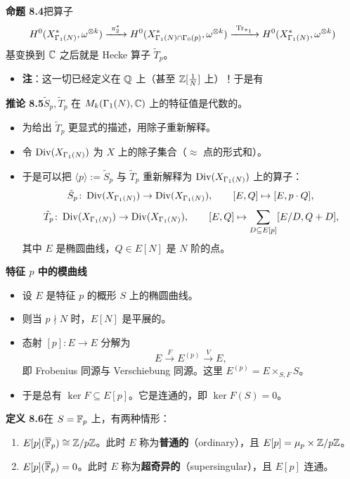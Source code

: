 \noindent\textbf{命题 8.4}\label{prop:8.4}\quad 把算子
\[
H^0(X^*_{\Gamma_1(N)},\omega^{\otimes k})\xrightarrow{\ \pi_2^*\ }H^0(X^*_{\Gamma_1(N)\cap\Gamma_0(p)},\omega^{\otimes k})\xrightarrow{\ \Tr_{\pi_1}\ }H^0(X^*_{\Gamma_1(N)},\omega^{\otimes k})
\]
基变换到 $\mathbb{C}$ 之后就是 Hecke 算子 $\tilde T_p$。

\begin{itemize}
\item \textbf{注}：这一切已经定义在 $\mathbb{Q}$ 上（甚至 $\mathbb{Z}[\frac1N]$ 上）！于是有
\end{itemize}

\noindent\textbf{推论 8.5}\label{cor:8.5}\quad $\tilde S_p,\tilde T_p$ 在 $M_k(\Gamma_1(N),\mathbb{C})$ 上的特征值是代数的。

\begin{itemize}
\item 为给出 $\tilde T_p$ 更显式的描述，用除子重新解释。
\item 令 $\operatorname{Div}(X_{\Gamma_1(N)})$ 为 $X$ 上的除子集合（$\approx$ 点的形式和）。
\item 于是可以把 $\langle p\rangle:=\tilde S_p$ 与 $\tilde T_p$ 重新解释为 $\operatorname{Div}(X_{\Gamma_1(N)})$ 上的算子：
\[
\tilde S_p\colon\operatorname{Div}(X_{\Gamma_1(N)})\to\operatorname{Div}(X_{\Gamma_1(N)}),\qquad [E,Q]\mapsto[E,p\cdot Q],
\]
\[
\tilde T_p\colon\operatorname{Div}(X_{\Gamma_1(N)})\to\operatorname{Div}(X_{\Gamma_1(N)}),\qquad [E,Q]\mapsto\sum_{D\subseteq E[p]}[E/D,Q+D],
\]
其中 $E$ 是椭圆曲线，$Q\in E[N]$ 是 $N$ 阶的点。
\end{itemize}

\medskip
\noindent\textbf{特征 $p$ 中的模曲线}
\begin{itemize}
\item 设 $E$ 是特征 $p$ 的概形 $S$ 上的椭圆曲线。
\item 则当 $p\nmid N$ 时，$E[N]$ 是平展的。
\item 态射 $[p]\colon E\to E$ 分解为
\[
E\xrightarrow{\ F\ }E^{(p)}\xrightarrow{\ V\ }E,
\]
即 Frobenius 同源与 Verschiebung 同源。这里 $E^{(p)}=E\times_{S,F}S$。
\item 于是总有 $\ker F\subseteq E[p]$。它是连通的，即 $\ker F(S)=0$。
\end{itemize}

\noindent\textbf{定义 8.6}\label{def:8.6}\quad 在 $S=\mathbb{F}_p$ 上，有两种情形：

\begin{enumerate}
\item[(1)] $E[p](\overline{\mathbb{F}}_p)\cong\mathbb{Z}/p\mathbb{Z}$。此时 $E$ 称为\textbf{普通的}（ordinary），且 $E[p]=\mu_p\times\mathbb{Z}/p\mathbb{Z}$。
\item[(2)] $E[p](\overline{\mathbb{F}}_p)=0$。此时 $E$ 称为\textbf{超奇异的}（supersingular），且 $E[p]$ 连通。
\end{enumerate}

